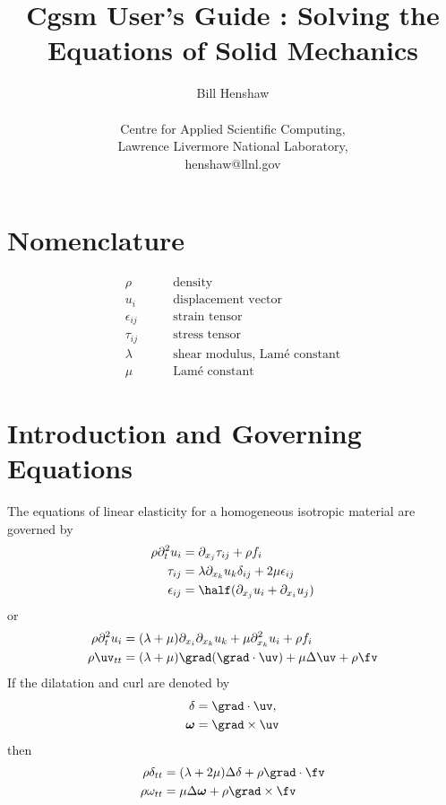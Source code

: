 \documentclass[11pt]{article}
\newcommand{\omegav}{\boldsymbol{\omega}}
\begin{document}
 
\title{Cgsm User's Guide : Solving the Equations of Solid Mechanics}

\author{
Bill Henshaw \\
\  \\
Centre for Applied Scientific Computing, \\
Lawrence Livermore National Laboratory, \\
henshaw@llnl.gov }
 
\maketitle

\tableofcontents

\section{Nomenclature}
\begin{align}
  \rho & \qquad \mbox{density} \\
  u_i & \qquad \mbox{displacement vector} \\
  \epsilon_{ij} & \qquad \mbox{strain tensor} \\
  \tau_{ij} & \qquad \mbox{stress tensor} \\
  \lambda & \qquad \mbox{shear modulus, Lam\'e constant} \\
  \mu & \qquad \mbox{Lam\'e constant}
\end{align}

\section{Introduction and Governing Equations}

The equations of linear elasticity for a homogeneous isotropic material are governed by
\begin{align}
  \rho \partial_t^2 u_i &= \partial_{x_j} \tau_{ij} + \rho f_i \\
  \tau_{ij} &= \lambda \partial_{x_k} u_k \delta_{ij} + 2 \mu \epsilon_{ij} \\
  \epsilon_{ij} &= \half( \partial_{x_j} u_i + \partial_{x_i} u_j )
\end{align}
or
\begin{align}
  \rho \partial_t^2 u_i &= (\lambda+\mu) \partial_{x_i} \partial_{x_k} u_k + \mu \partial_{x_k}^2 u_i  +\rho f_i \\
  \rho \uv_{tt} &= (\lambda+\mu) \grad(\grad\cdot\uv) + \mu \Delta \uv + \rho \fv 
\end{align}
If the dilatation and curl are denoted by
\begin{align}
  \delta &= \grad\cdot\uv , \\
  \omegav &= \grad\times\uv
\end{align}
then
\begin{align}
  \rho \delta_{tt} &= (\lambda+2\mu) \Delta \delta +\rho\grad\cdot\fv \\
  \rho \omega_{tt} &= \mu \Delta \omegav + \rho \grad\times\fv 
\end{align}
\end{document}
